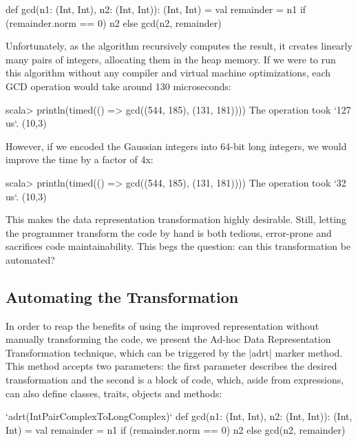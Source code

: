 \begin{lstlisting-nobreak}
def gcd(n1: (Int, Int), n2: (Int, Int)): (Int, Int) = {
  val remainder = n1 %
  if (remainder.norm == 0) n2 else gcd(n2, remainder)
}
\end{lstlisting-nobreak}

Unfortunately, as the algorithm recursively computes the result, it creates linearly many pairs of integers, allocating them in the heap memory. If we were to run this algorithm without any compiler and virtual machine optimizations, each GCD operation would take around 130 microseconds:

\begin{lstlisting-nobreak}
scala>   println(timed(() => gcd((544, 185), (131, 181))))
The operation took `127 us`.
(10,3)
\end{lstlisting-nobreak}

However, if we encoded the Gaussian integers into 64-bit long integers, we would improve the time by a factor of 4x:

\begin{lstlisting-nobreak}
scala> println(timed(() => gcd((544, 185), (131, 181))))
The operation took `32 us`.
(10,3)
\end{lstlisting-nobreak}

This makes the data representation transformation highly desirable. Still, letting the programmer transform the code by hand is both tedious, error-prone and sacrifices code maintainability. This begs the question: can this transformation be automated?

\subsection{Automating the Transformation}

In order to reap the benefits of using the improved representation without manually transforming the code, we present the Ad-hoc Data Representation Transformation technique, which can be triggered by the |adrt| marker method. This method accepts two parameters: the first parameter describes the desired transformation and the second is a block of code, which, aside from expressions, can also define classes, traits, objects and methods:

\begin{lstlisting-nobreak}
`adrt(IntPairComplexToLongComplex)` {
  def gcd(n1: (Int, Int), n2: (Int, Int)): (Int, Int) = {
    val remainder = n1 %
    if (remainder.norm == 0) n2 else gcd(n2, remainder)
  }
}
\end{lstlisting-nobreak}

